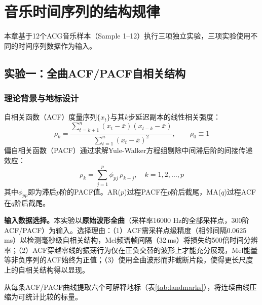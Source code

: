 \documentclass[12pt,a4paper]{article}
\begin{document}
\FloatBarrier
\section{音乐时间序列的结构规律}

本章基于12个ACG音乐样本（Sample 1--12）执行三项独立实验，三项实验使用不同的时间序列数据作为输入。

\FloatBarrier
\subsection{实验一：全曲ACF/PACF自相关结构}

\subsubsection{理论背景与地标设计}

自相关函数（ACF）度量序列$\{x_t\}$与其$k$步延迟副本的线性相关强度\cite{box2015}：
\begin{equation}
    \rho_k = \frac{\sum_{t=k+1}^{n}(x_t-\bar{x})(x_{t-k}-\bar{x})}{\sum_{t=1}^{n}(x_t-\bar{x})^2},\qquad \rho_0\equiv 1
    \label{eq:acf}
\end{equation}
偏自相关函数（PACF）通过求解Yule-Walker方程组剔除中间滞后阶的间接传递效应\cite{box2015}：
\begin{equation}
    \rho_k = \sum_{j=1}^{p}\phi_{pj}\,\rho_{k-j},\quad k=1,2,\ldots,p
    \label{eq:yulewalker}
\end{equation}
其中$\phi_{pp}$即为滞后$p$阶的PACF值。AR($p$)过程PACF在$p$阶后截尾，MA($q$)过程ACF在$q$阶后截尾。

\textbf{输入数据选择。}本实验以\textbf{原始波形全曲}（采样率16000 Hz的全部采样点，300阶ACF/PACF）为输入。选择理由：（1）ACF需采样点级精度（相邻间隔0.0625\,ms）以检测毫秒级自相关结构，Mel频谱帧间隔（32\,ms）将损失约500倍时间分辨率；（2）ACF穿越零线的振荡行为仅在正负交替的波形上才能充分展现，Mel能量等非负序列的ACF始终为正值；（3）使用全曲波形而非截断片段，使得更长尺度上的自相关结构得以显现。

从每条ACF/PACF曲线提取六个可解释地标（表\ref{tab:landmarks}），将连续曲线压缩为可统计比较的标量。
\end{document}
